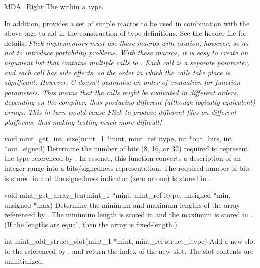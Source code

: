 \begin{cprototypelist}
\begin{cprototypelist}
\begin{cidentifierlist}
      \item[MDA_Right]
       The  within a
       type.
    \end{cidentifierlist}

    In addition,  provides a set of simple
     macros to be used in combination with the above
    tags to aid in the construction of \MINT{} type definitions.  See the
    header file for details.
    \emph{Flick implementors must use these macros with caution, however, so as
    not to introduce portability problems.  With these macros, it is easy to
    create an argument list that contains multiple calls to
    . Each call is a separate parameter, and each
    call has side effects, so the order in which the calls take place is
    significant.  However, C doesn't guarantee an order of evaluation for
    function parameters.  This means that the calls might be evaluated in
    different orders, depending on the compiler, thus producing different
    (although logically equivalent)  arrays.  This in turn
    would cause Flick to produce different \PRESC{} files on different
    platforms, thus making testing much more difficult!}
  \end{cprototypelist}


  \item[void mint_get_int_size(mint_1 *mint, mint_ref itype, int *out_bits,
                               int *out_signed)]
  Determine the number of bits (8, 16, or 32) required to represent the \MINT{}
  type referenced by .  In essence, this function converts a
  description of an integer range into a bits/signedness representation.  The
  required number of bits is stored in  and the
  signedness indicator (zero or one) is stored in .

  \item[void mint_get_array_len(mint_1 *mint, mint_ref itype, unsigned *min,
  unsigned *max)]
  Determine the minimum and maximum lengths of the \MINT{} array referenced by
  .  The minimum length is stored in  and
  the maximum is stored in .  (If the lengths are equal, then
  the array is fixed-length.)

  \item[int mint_add_struct_slot(mint_1 *mint, mint_ref struct_itype)]
  Add a new slot to the  referenced by
  , and return the index of the new slot.  The slot
  contents are uninitialized.


\end{cprototypelist}
